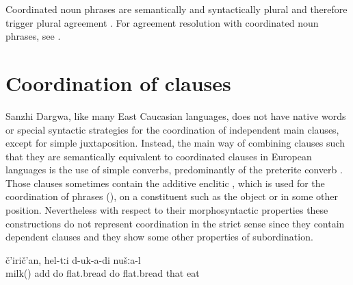 Coordinated noun phrases are semantically and syntactically plural and therefore trigger plural agreement . For agreement resolution with coordinated noun phrases, see .



\section{Coordination of clauses}
\label{sec:Coordination of clauses other phrases}

Sanzhi Dargwa, like many East Caucasian languages, does not have native words or special syntactic strategies for the coordination of independent main clauses, except for simple juxtaposition. Instead, the main way of combining clauses such that they are semantically equivalent to coordinated clauses in European languages is the use of simple converbs, predominantly of the preterite converb . Those clauses sometimes contain the additive enclitic , which is used for the coordination of phrases (), on a constituent such as the object or in some other position. Nevertheless with respect to their morphosyntactic properties these constructions do not represent coordination in the strict sense since they contain dependent clauses and they show some other properties of subordination.
%
\begin{exe}
	\ex	\label{ex:‎We added milk, prepared flat breads and ate them}
		č'irič'an,	hel-tːi	d-uk-a-di	nušːa-l\\
		milk() add	do	flat.bread	do	flat.bread	that	eat	\\
	\glt	{}
\end{exe}

